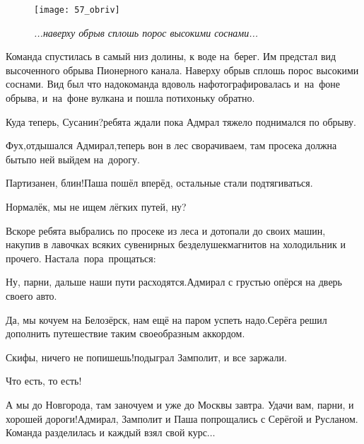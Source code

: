 \begin{figure}[h]
	\centering
	\texttt{[image: 57\_obriv]}
	\caption{\small\textit{...наверху обрыв сплошь порос высокими соснами...}}
\end{figure}

Команда спустилась в самый низ долины, к воде на~берег. Им предстал вид высоченного обрыва Пионерного канала. Наверху обрыв сплошь порос высокими соснами. Вид был что надо\mdash команда вдоволь нафотографировалась и~на~фоне обрыва, и~на~фоне вулкана и пошла потихоньку обратно.

\diagdash Куда теперь, Сусанин?\mdash ребята ждали пока Адмрал тяжело поднимался по обрыву.

\diagdash Фух,\mdash отдышался Адмирал,\mdash теперь вон в лес сворачиваем, там просека должна быть\mdash по ней выйдем на~дорогу.

\diagdash Партизанен, блин!\mdash Паша пошёл вперёд, остальные стали подтягиваться.

\diagdash Нормалёк, мы не ищем лёгких путей, ну?


Вскоре ребята выбрались по просеке из леса и дотопали до своих машин, накупив в лавочках всяких сувенирных безделушек\mdash магнитов на холодильник и прочего. Настала~пора~прощаться:

\diagdash Ну, парни, дальше наши пути расходятся.\mdash Адмирал с грустью опёрся на дверь своего авто.

\diagdash Да, мы кочуем на Белозёрск, нам ещё на паром успеть надо.\mdash Серёга решил дополнить путешествие таким своеобразным аккордом.

\diagdash Скифы, ничего не попишешь!\mdash подыграл Замполит, и все заржали.

\diagdash Что есть, то есть! 

\diagdash А мы до Новгорода, там заночуем и уже до Москвы завтра. Удачи вам, парни, и хорошей дороги!\mdash Адмирал, Замполит и Паша попрощались с Серёгой и Русланом. Команда разделилась и каждый взял свой курс$\ldots$

